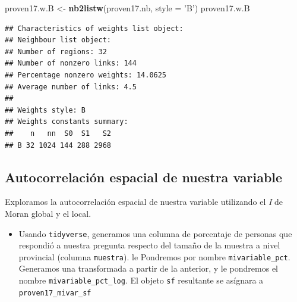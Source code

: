 \documentclass[11pt,]{article}
\newenvironment{Shaded}{\begin{snugshade}}{\end{snugshade}}
\newcommand{\KeywordTok}[1]{\textcolor[rgb]{0.13,0.29,0.53}{\textbf{#1}}}
\newcommand{\DataTypeTok}[1]{\textcolor[rgb]{0.13,0.29,0.53}{#1}}
\newcommand{\StringTok}[1]{\textcolor[rgb]{0.31,0.60,0.02}{#1}}
\newcommand{\NormalTok}[1]{#1}
\providecommand{\tightlist}{%
\setlength{\itemsep}{0pt}\setlength{\parskip}{0pt}}
\begin{document}
\begin{Shaded}
\begin{Highlighting}[]
\NormalTok{proven17.w.B <-}\StringTok{ }\KeywordTok{nb2listw}\NormalTok{(proven17.nb, }\DataTypeTok{style =} \StringTok{'B'}\NormalTok{)}
\NormalTok{proven17.w.B}
\end{Highlighting}
\end{Shaded}

\begin{verbatim}
## Characteristics of weights list object:
## Neighbour list object:
## Number of regions: 32 
## Number of nonzero links: 144 
## Percentage nonzero weights: 14.0625 
## Average number of links: 4.5 
## 
## Weights style: B 
## Weights constants summary:
##    n   nn  S0  S1   S2
## B 32 1024 144 288 2968
\end{verbatim}

\subsection{Autocorrelación espacial de nuestra
variable}\label{autocorrelaciuxf3n-espacial-de-nuestra-variable}

Exploramos la autocorrelación espacial de nuestra variable utilizando el
\emph{I} de Moran global y el local.

\begin{itemize}
\tightlist
\item
  Usando \texttt{tidyverse}, generamos una columna de porcentaje de
  personas que respondió a nuestra pregunta respecto del tamaño de la
  muestra a nivel provincial (columna \texttt{muestra}). le Pondremos
  por nombre \texttt{mivariable\_pct}. Generamos una transformada a
  partir de la anterior, y le pondremos el nombre
  \texttt{mivariable\_pct\_log}. El objeto \texttt{sf} resultante se
  asígnara a \texttt{proven17\_mivar\_sf}
\end{itemize}
\end{document}
